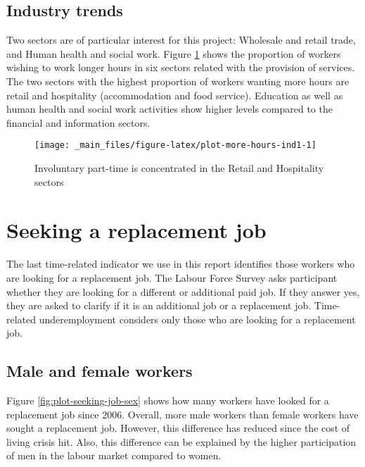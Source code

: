 \documentclass[
]{book}
\begin{document}
\hypertarget{industry-trends-1}{%
\subsection{Industry trends}\label{industry-trends-1}}

Two sectors are of particular interest for this project: Wholesale and retail trade, and Human health and social work. Figure \ref{fig:plot-more-hours-ind1} shows the proportion of workers wishing to work longer hours in six sectors related with the provision of services. The two sectors with the highest proportion of workers wanting more hours are retail and hospitality (accommodation and food service). Education as well as human health and social work activities show higher levels compared to the financial and information sectors.

\begin{figure}

{\centering \texttt{[image: \_main\_files/figure-latex/plot-more-hours-ind1-1]} 

}

\caption{Involuntary part-time is concentrated in the Retail and Hospitality sectors}\label{fig:plot-more-hours-ind1}
\end{figure}

\hypertarget{seeking-a-replacement-job}{%
\section{Seeking a replacement job}\label{seeking-a-replacement-job}}

The last time-related indicator we use in this report identifies those workers who are looking for a replacement job. The Labour Force Survey asks participant whether they are looking for a different or additional paid job. If they answer yes, they are asked to clarify if it is an additional job or a replacement job. Time-related underemployment considers only those who are looking for a replacement job.

\hypertarget{male-and-female-workers-2}{%
\subsection{Male and female workers}\label{male-and-female-workers-2}}

Figure \ref{fig:plot-seeking-job-sex} shows how many workers have looked for a replacement job since 2006. Overall, more male workers than female workers have sought a replacement job. However, this difference has reduced since the cost of living crisis hit. Also, this difference can be explained by the higher participation of men in the labour market compared to women.
\end{document}

